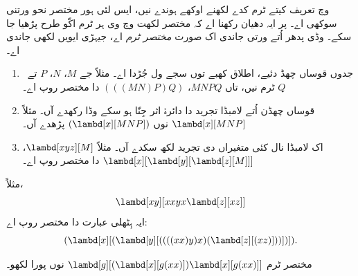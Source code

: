 \documentclass[../../../include/open-logic-section]{subfiles}
\begin{document}

 وچ تعریف کیتے ٹرم کدے لکھنے اوکھے
ہوندے نیں، ایس لئی ہور مختصر نحو ورتنی سوکھی اے۔ پر ایہ دھیان
رکھنا اے کہ مختصر لکھت وچ وی ہر ٹرم اکّو طرح پڑھیا جا سکے۔
وڈی پدھر اُتے ورتی جاندی اک صورت \emph{مختصر ٹرم} اے، جیہڑی
ایویں لکھی جاندی اے۔

\begin{enumerate}
\item جدوں قوساں چھڈ دئیے، اطلاق کھبے توں سجے ول جُڑدا اے۔
  مثلاً جے $M$، $N$، $P$ تے~$Q$ ٹرم نیں، تاں $MNPQ$،
  $(((MN)P)Q)$ دا مختصر روپ اے۔
\item قوساں چھڈن اُتے لامبڈا تجرید دا دائرۂ اثر جِنّا ہو سکے
  وڈا رکھدے آں۔ مثلاً $\lambd[x][MNP]$ نوں
  $(\lambd[x][MNP])$ پڑھدے آں۔
\item اک لامبڈا نال کئی متغیراں دی تجرید لکھ سکدے آں۔
  مثلاً $\lambd[xyz][M]$،
  $\lambd[x][\lambd[y][\lambd[z][M]]]$ دا مختصر روپ اے۔
\end{enumerate}

مثلاً،
\[
\lambd[xy][xxyx \lambd[z][xz]]
\]
ایہ ہِٹھلی عبارت دا مختصر روپ اے:
\[
(\lambd[x][(\lambd[y][((((xx)y)x)(\lambd[z][(xz)]))])]).
\]

\begin{prob}
مختصر ٹرم $\lambd[g][(\lambd[x][g (x x)])
  \lambd[x][g (x x)]]$ نوں پورا لکھو۔
\end{prob}
\end{document}
